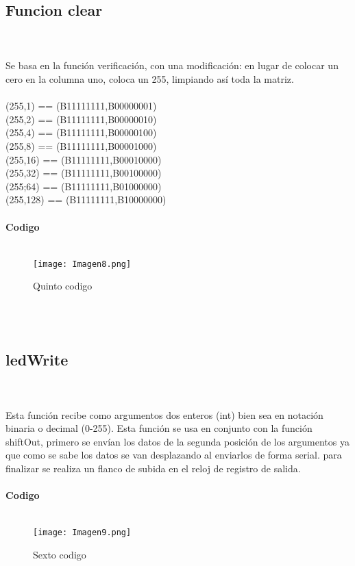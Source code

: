 \documentclass{article}
\begin{document}
\subsection{\large Funcion clear}\\\\
Se basa en la función verificación, con una modificación: en lugar de colocar un cero en la columna uno, coloca un 255, limpiando así toda la matriz.\\\\
(255,1) == (B11111111,B00000001)\\
(255,2) == (B11111111,B00000010) \\
(255,4) == (B11111111,B00000100) \\ 
(255,8) == (B11111111,B00001000) \\
(255,16) == (B11111111,B00010000) \\
(255,32) == (B11111111,B00100000) \\
(255;64) == (B11111111,B01000000) \\
(255,128) == (B11111111,B10000000) \\
\\
\textbf{\large Codigo}\\\\
\begin{figure}[h]
    \texttt{[image: Imagen8.png]}
    \centering
    \caption{Quinto codigo}
    \label{fig:Imagen8}
\end{figure}\\\\
\subsection{\large ledWrite}\\\\
Esta función recibe como argumentos dos enteros (int) bien sea en notación binaria o decimal (0-255).
Esta función se usa en conjunto con la función shiftOut, primero se envían los datos de la segunda posición de los argumentos ya que como se sabe los datos se van desplazando al enviarlos de forma serial. para finalizar se realiza un flanco de subida en el reloj de registro de salida.\\
\\
\textbf{\large Codigo}\\\\
\begin{figure}[h]
    \texttt{[image: Imagen9.png]}
    \centering
    \caption{Sexto codigo}
    \label{fig:Imagen9}
\end{figure}\\\\
\end{document}

